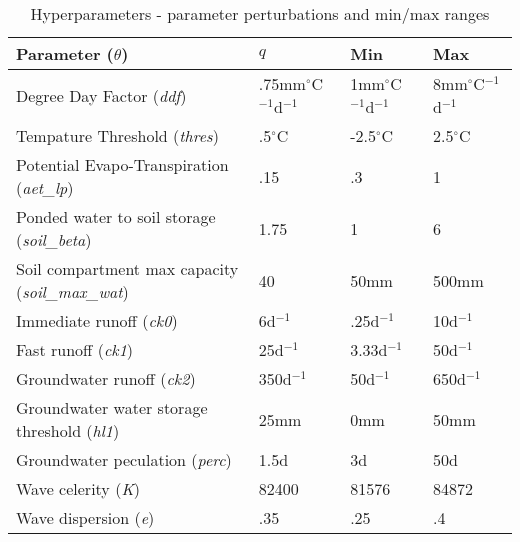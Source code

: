 \begin{table}[]
\caption{Hyperparameters - parameter perturbations and min/max ranges} 
\begin{tabular}{llll}
Parameter ($\theta$) & $q$ & Min & Max \\ \hline
Degree Day Factor (\textit{ddf})                 & .75mm$^\circ$C$^{-1}$d$^{-1}$ & 1mm$^\circ$C$^{-1}$d$^{-1}$ & 8mm$^\circ$C$^{-1}$d$^{-1}$ \\
Tempature Threshold (\textit{thres})                & .5$^\circ$C & -2.5$^\circ$C & 2.5$^\circ$C \\
Potential Evapo-Transpiration (\textit{aet\_lp})              & .15 & .3 & 1\\
Ponded water to soil storage (\textit{soil\_beta})          & 1.75 & 1 & 6 \\
Soil compartment max capacity (\textit{soil\_max\_wat})       & 40 & 50mm & 500mm \\
Immediate runoff (\textit{ck0})       & 6d$^{-1}$ & .25d$^{-1}$ & 10d$^{-1}$ \\
Fast runoff (\textit{ck1})      & 25d$^{-1}$ & 3.33d$^{-1}$ & 50d$^{-1}$\\
Groundwater runoff (\textit{ck2})       & 350d$^{-1}$ & 50d$^{-1}$ & 650d$^{-1}$ \\
Groundwater water storage threshold (\textit{hl1})       & 25mm & 0mm & 50mm \\
Groundwater peculation (\textit{perc})       & 1.5d & 3d & 50d \\
Wave celerity (\textit{K})         & 82400 & 81576 & 84872 \\
Wave dispersion (\textit{e})       & .35 & .25 & .4 \\
\end{tabular}
\label{tab:t_param_min_max}
\end{table}

